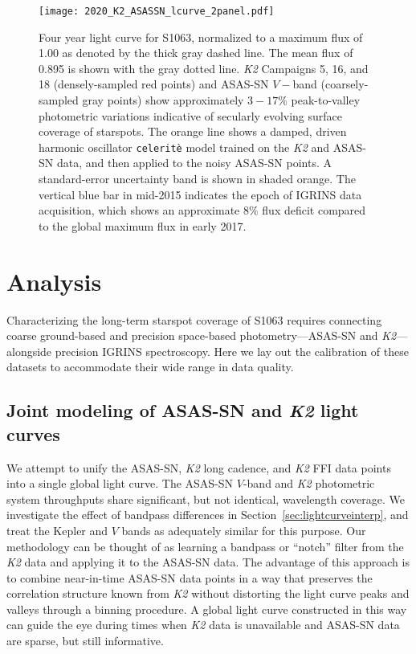 \documentclass[twocolumn,tighten]{aastex631}
\begin{document}
\begin{figure*}[ht]
  \centering
  \texttt{[image: 2020\_K2\_ASASSN\_lcurve\_2panel.pdf]}
\caption{Four year light curve for S1063, normalized to a maximum flux of 1.00 as denoted by the thick gray dashed line. The mean flux of 0.895 is shown with the gray dotted line.  \emph{K2} Campaigns 5, 16, and 18 (densely-sampled red points) and ASAS-SN $V-$band (coarsely-sampled gray points) show approximately $3-17\%$ peak-to-valley photometric variations indicative of secularly evolving surface coverage of starspots.  The orange line shows a damped, driven harmonic oscillator \texttt{celerit\`e} model \citep{2017AJ....154..220F} trained on the \emph{K2} and ASAS-SN data, and then applied to the noisy ASAS-SN points. A standard-error uncertainty band is shown in shaded orange. The vertical blue bar in mid-2015 indicates the epoch of IGRINS data acquisition, which shows an approximate $8\%$ flux deficit compared to the global maximum flux in early 2017.}
\label{fig:lightcurve}
\end{figure*}


\section{Analysis}
\label{sec:analysis}

Characterizing the long-term starspot coverage of S1063 requires connecting coarse ground-based and precision space-based photometry---ASAS-SN and \emph{K2}---alongside precision IGRINS spectroscopy.  Here we lay out the calibration of these datasets to accommodate their wide range in data quality.


\subsection{Joint modeling of ASAS-SN and \emph{K2} light curves}

We attempt to unify the ASAS-SN, \emph{K2} long cadence, and \emph{K2} FFI data points into a single global light curve.  The ASAS-SN $V$-band and \emph{K2} photometric system throughputs share significant, but not identical, wavelength coverage.  We investigate the effect of bandpass differences in Section~\ref{sec:lightcurveinterp}, and treat the Kepler and $V$ bands as adequately similar for this purpose. Our methodology can be thought of as learning a bandpass or ``notch'' filter from the \emph{K2} data and applying it to the ASAS-SN data.  The advantage of this approach is to combine near-in-time ASAS-SN data points in a way that preserves the correlation structure known from \emph{K2} without distorting the light curve peaks and valleys through a binning procedure.  A global light curve constructed in this way can guide the eye during times when \emph{K2} data is unavailable and ASAS-SN data are sparse, but still informative.
\end{document}
